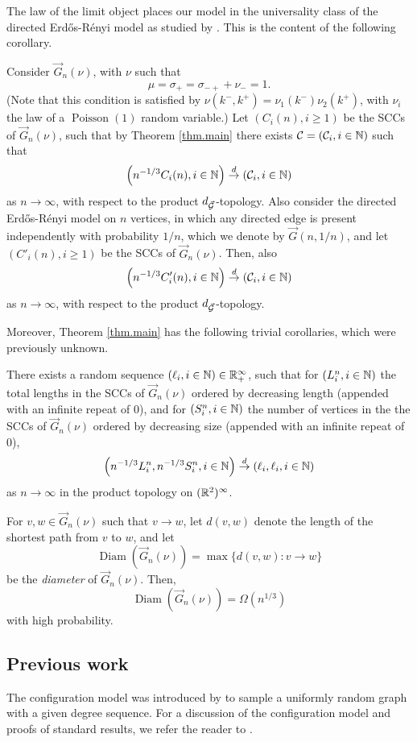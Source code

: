 The law of the limit object places our model in the universality class of the directed Erd\H{o}s-Rényi model as studied by \citet{goldschmidtScalingLimitCritical2019}. This is the content of the following corollary.
\begin{corollary}
Consider $\vec{G}_n(\nu)$, with $\nu$ such that $$\mu=\sigma_+=\sigma_{-+}+\nu_-=1.$$ (Note that this condition is satisfied by $\nu(k^-,k^+)=\nu_1(k^-)\nu_2(k^+)$, with $\nu_i$ the law of a $\operatorname{Poisson}(1)$ random variable.)
Let $(C_i(n), i\geq 1)$ be the SCCs of $\vec{G}_n(\nu)$, such that by Theorem \ref{thm.main} there exists ${\mathcal C}=({\mathcal C}_i,i\in {\mathbb N})$ such that 
$$\left(n^{-1/3}C_i(n),i\in {\mathbb N}\right)\overset{d}{\to}\left({\mathcal C}_i,i\in {\mathbb N}\right)$$
as $n\to \infty$, with respect to the product $d_{\vec{{\mathcal G}}}$-topology. Also consider the directed Erd\H{o}s-R\'enyi model on $n$ vertices, in which any directed edge is present independently with probability $1/n$, which we denote by $\vec{G}(n,1/n)$, and let $(C'_i(n), i\geq 1)$ be the SCCs of $\vec{G}_n(\nu)$. Then, also
$$\left(n^{-1/3}C'_i(n),i\in {\mathbb N}\right)\overset{d}{\to}\left({\mathcal C}_i,i\in {\mathbb N}\right)$$
as $n\to \infty$, with respect to the product $d_{\vec{{\mathcal G}}}$-topology. 
\end{corollary}
Moreover, Theorem \ref{thm.main} has the following trivial corollaries, which were previously unknown. 
\begin{corollary}
There exists a random sequence $(\ell_i,i\in {\mathbb N})\in {\mathbb R}_+^\infty$, such that for $(L^n_i,i\in {\mathbb N})$ the total lengths in the SCCs of $\vec{G}_n(\nu)$ ordered by decreasing length (appended with an infinite repeat of $0$), and for $(S^n_i,i\in{\mathbb N})$ the number of vertices in the the SCCs of $\vec{G}_n(\nu)$ ordered by decreasing size (appended with an infinite repeat of $0$),
$$\left(n^{-1/3}L^n_i,n^{-1/3}S^n_i, i\in {\mathbb N}\right)\overset{d}{\to}\left(\ell_i,\ell_i,i\in {\mathbb N}\right)$$
as $n\to \infty$ in the product topology on $({\mathbb R}^2)^\infty$. 
\end{corollary}
\begin{corollary}
For $v,w\in \vec{G}_n(\nu)$ such that $v\to w$, let $d(v,w)$ denote the length of the shortest path from $v$ to $w$, and let $$\operatorname{Diam}\left(\vec{G}_n(\nu)\right)=\max\{d(v,w):v\to w\}$$ be the \emph{diameter} of $\vec{G}_n(\nu)$. Then,  $$\operatorname{Diam}\left(\vec{G}_n(\nu)\right)=\Omega(n^{1/3})$$
with high probability.
\end{corollary}


\subsection{Previous work}
The configuration model was introduced by \citet{Bollobas1980} to sample a uniformly random graph with a given degree sequence. For a discussion of the configuration model and proofs of standard results, we refer the reader to \cite[Chapter 7]{hofstadRandomGraphsComplex2017}.

